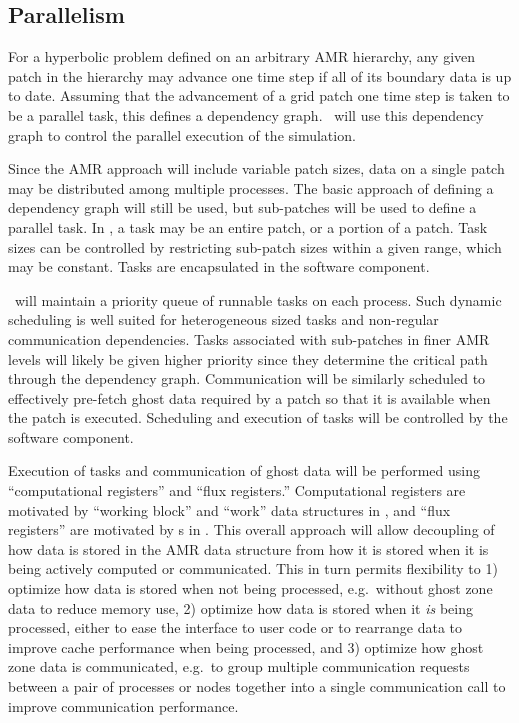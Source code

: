 \documentclass[10pt,twocolumn]{article}
\begin{document}
\subsection{Parallelism} \label{ss:design-parallel}

For a hyperbolic problem defined on an arbitrary AMR hierarchy, any
given patch in the hierarchy may advance one time step if all of its
boundary data is up to date.  Assuming that the advancement of a grid
patch one time step is taken to be a parallel task, this defines a
dependency graph.  \cello\ will use this dependency graph to control
the parallel execution of the simulation.

Since the AMR approach will include variable patch sizes, data on a
single patch may be distributed among multiple processes.  The basic
approach of defining a dependency graph will still be used, but
sub-patches will be used to define a parallel task.  In \cello, a task
may be an entire patch, or a portion of a patch.  Task sizes can be
controlled by restricting sub-patch sizes within a given range, which
may be constant.  Tasks are encapsulated in the  software
component.

\cello\ will maintain a priority queue of runnable tasks on each
process.  Such dynamic scheduling is well suited for heterogeneous
sized tasks and non-regular communication dependencies. Tasks
associated with sub-patches in finer AMR levels will likely be given
higher priority since they determine the critical path through the
dependency graph.  Communication will be similarly scheduled to
effectively pre-fetch ghost data required by a patch so that it is
available when the patch is executed.  Scheduling and execution of
tasks will be controlled by the  software component.

Execution of tasks and communication of ghost data will be performed
using ``computational registers'' and ``flux registers.''
Computational registers are motivated by ``working block'' and
``work'' data structures in \paramesh, and ``flux registers'' are
motivated by s in \chombo.  This overall
approach will allow decoupling of how data is stored in the AMR data
structure from how it is stored when it is being actively computed or
communicated.  This in turn permits flexibility to 1) optimize how
data is stored when not being processed, e.g.~without ghost zone data
to reduce memory use, 2) optimize how data is stored when it
\textit{is} being processed, either to ease the interface to user code
or to rearrange data to improve cache performance when being
processed, and 3) optimize how ghost zone data is communicated,
e.g.~to group multiple communication requests between a pair of
processes or nodes together into a single communication call to
improve communication performance.
\end{document}

